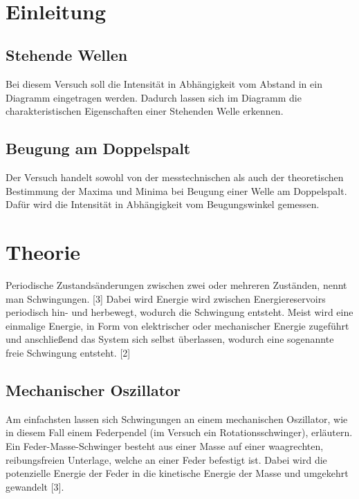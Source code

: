 \documentclass[a4paper]{scrartcl}
\def\header#1#2{
  \begin{center}
    {\Large #1}\\
    {#2}
  \end{center}
}
\numberwithin{equation}{subsection}
\begin{document}
\vspace{10pt}
\header{\HEADDING}{\SUBHEADDING}

\tableofcontents

\newpage

\section{Einleitung}
\subsection{Stehende Wellen}
Bei diesem Versuch soll die Intensität in Abhängigkeit vom Abstand in ein Diagramm eingetragen werden. Dadurch lassen sich im Diagramm die charakteristischen Eigenschaften einer Stehenden Welle erkennen.
\subsection{Beugung am Doppelspalt}
Der Versuch handelt sowohl von der messtechnischen als auch der theoretischen Bestimmung der Maxima und Minima bei Beugung einer Welle am Doppelspalt. Dafür wird die Intensität in Abhängigkeit vom Beugungswinkel gemessen.

\newpage

\section{Theorie}
Periodische Zustandsänderungen zwischen zwei oder mehreren Zuständen, nennt man Schwingungen. [3]
Dabei wird Energie wird zwischen Energiereservoirs periodisch hin- und herbewegt, wodurch die Schwingung entsteht.
Meist wird eine einmalige Energie, in Form von elektrischer oder
mechanischer Energie zugeführt und anschließend das System sich selbst überlassen, wodurch eine sogenannte freie Schwingung entsteht. [2]

\subsection{Mechanischer Oszillator}
Am einfachsten lassen sich Schwingungen an einem mechanischen Oszillator, wie in diesem Fall einem Federpendel (im Versuch ein Rotationsschwinger), erläutern. Ein Feder-Masse-Schwinger besteht aus einer Masse auf einer waagrechten, reibungsfreien Unterlage, welche an einer Feder befestigt ist. Dabei wird die potenzielle Energie der Feder in die kinetische Energie der Masse und umgekehrt gewandelt [3].

\end{document}
